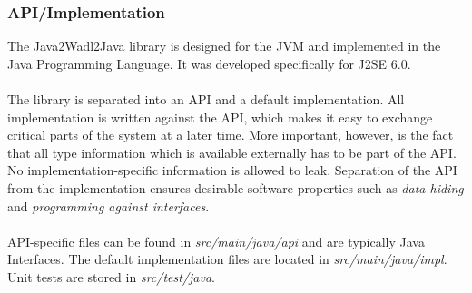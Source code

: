 \subsubsection{API/Implementation}
The Java2Wadl2Java library is designed for the JVM and implemented in the Java Programming Language. It was developed specifically for J2SE 6.0.
\\ \\
The library is separated into an API and a default implementation. All implementation is written against the API, which makes it easy to exchange critical parts of the system at a later time. More important, however, is the fact that all type information which is available externally has to be part of the API. No implementation-specific information is allowed to leak. Separation of the API from the implementation ensures desirable software properties such as \emph{data hiding} and \emph{programming against interfaces}.
\\ \\
API-specific files can be found in \emph{src/main/java/api} and are typically Java Interfaces. The default implementation files are located in \emph{src/main/java/impl}. Unit tests are stored in \emph{src/test/java}.

